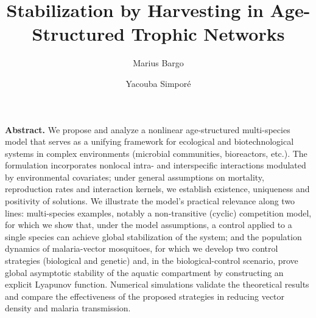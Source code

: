 \documentclass[10pt, a4paper]{amsart}
\author{Marius Bargo}
\author{Yacouba Simporé}
\title[Analysis and stabilization]{Stabilization by Harvesting in Age-Structured Trophic Networks}%
\date{}%
\newcounter{assu}
\theoremstyle{plain}
\theoremstyle{definition}
\theoremstyle{remark}
\numberwithin{equation}{section}
\begin{document}
\maketitle

{\bf Abstract.} We propose and analyze a nonlinear age-structured multi-species model that serves as a unifying framework for ecological and biotechnological systems in complex environments (microbial communities, bioreactors, etc.). The formulation incorporates nonlocal intra- and interspecific interactions modulated by environmental covariates; under general assumptions on mortality, reproduction rates and interaction kernels, we establish existence, uniqueness and positivity of solutions. We illustrate the model’s practical relevance along two lines:  multi-species examples, notably a non-transitive (cyclic) competition model, for which we show that, under the model assumptions, a control applied to a single species can achieve global stabilization of the system; %
and  the population dynamics of malaria-vector mosquitoes, for which we develop two control strategies (biological and genetic) and, in the biological-control scenario, prove global asymptotic stability of the aquatic compartment by constructing an explicit Lyapunov function. Numerical simulations validate the theoretical results and compare the effectiveness of the proposed strategies in reducing vector density and malaria transmission.%
\end{document}
